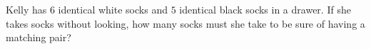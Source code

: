 Kelly has $6$ identical white socks and $5$ identical black socks in a drawer. If she takes socks without looking, how many socks must she take to be sure of having a matching pair?
